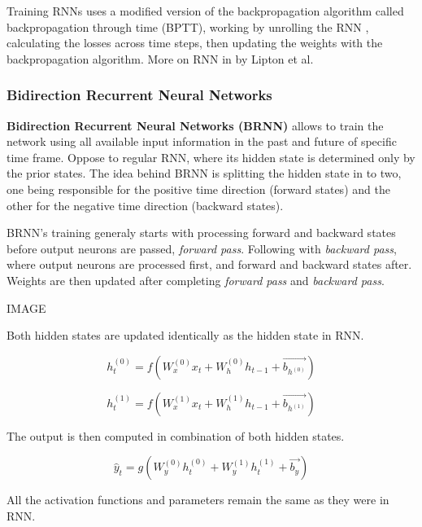 Training RNNs uses a modified version of the backpropagation algorithm called backpropagation through time (BPTT), working by unrolling the RNN \cite{Goodfellow-et-al-2016}, calculating the losses across time steps, then updating the weights with the backpropagation algorithm. More on RNN in \cite{lipton2015critical} by Lipton et al.


\subsubsection{Bidirection Recurrent Neural Networks}

\textbf{Bidirection Recurrent Neural Networks (BRNN)} allows to train the network using all available input information in the past and future of specific time frame. Oppose to regular RNN, where its hidden state is determined only by the prior states. The idea behind BRNN is splitting the hidden state in to two, one being responsible for the positive time direction (forward states) and the other for the negative time direction (backward states). 

BRNN's training generaly starts with processing forward and backward states before output neurons are passed, \textit{forward pass}. Following with \textit{backward pass}, where output neurons are processed first, and forward and backward states after. Weights are then updated after completing \textit{forward pass} and \textit{backward pass}.\cite{schusterbdrnn}

IMAGE %

Both hidden states are updated identically as the hidden state in RNN.

\begin{equation}
    {h_t^{(0)} = f(W_{x}^{(0)}x_t + W_{h}^{(0)}h_{t-1}+\vec{b_{h^{(0)}}})}
\end{equation}

\begin{equation}
    {h_t^{(1)} = f(W_{x}^{(1)}x_t + W_{h}^{(1)}h_{t-1}+\vec{b_{h^{(1)}}})}
\end{equation}

The output is then computed in combination of both hidden states.

\begin{equation}
    {\hat{y}_t = g(W_{y}^{(0)}h_t^{(0)} + W_{y}^{(1)}h_t^{(1)} + \vec{b_y})}
\end{equation}

All the activation functions and parameters remain the same as they were in RNN. 
